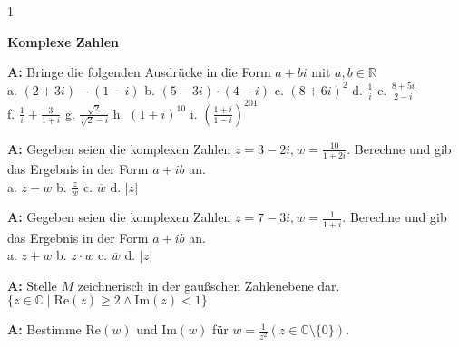 \documentclass[landscape,twocolumn,a4paper]{article}
\begin{document}
\newcommand\x{1}
\setcounter {y} {1}

\parindent 0mm

\textbf{Komplexe Zahlen}

\bigskip

\textbf{A:} Bringe die folgenden Ausdrücke in die Form $a + b i$ mit $a,b \in \mathbb{R}$ \\
a. $(2+3 i)-(1- i)$  \quad    b. $(5-3 i) \cdot (4- i)$  \quad c. $(8+6 i)^2$  \quad
d. $\frac{1}{i}$ \quad  e. $\frac{8+5 i}{2 - i}$  \\
f. $\frac{1}{i} + \frac{3}{1+i}$   \quad
g. $\frac{\sqrt{2}}{\sqrt{2}- i}$ \quad h. $(1+i)^{10}$ \quad i. $(\frac{1+i}{1-i})^{201}$
\bigskip {}

\textbf{A:} Gegeben seien die komplexen Zahlen $z = 3 - 2i, w = \frac{10}{1+2i}$. Berechne und
gib das Ergebnis in der Form $a + ib$ an. \\
a. $z-w$  \quad b. $\frac{z}{w}$ \quad c. $\overline{w}$ \quad d. $\left| z \right|$ 
\bigskip {}

\textbf{A:} Gegeben seien die komplexen Zahlen $z = 7 - 3i, w = \frac{1}{1+i}$. Berechne und
gib das Ergebnis in der Form $a + ib$ an. \\
a. $z+w$  \quad b. $z \cdot w$ \quad c. $\overline{w}$ \quad d. $\left| z \right|$ 
\bigskip {}

\textbf{A:} Stelle $M$ zeichnerisch in der gaußschen Zahlenebene dar. \\
 $\{z \in \mathbb{C} \mid  \text{Re}(z) \ge 2 \land \text{Im}(z) < 1\}$ 
\bigskip {}

\textbf{A:} Bestimme $\text{Re}(w)$ und $\text{Im}(w)$ für $w = \frac{1}{z^2} ( z \in \mathbb{C} 
\setminus \{0\})$. 
\bigskip {}

%
\end{document}
